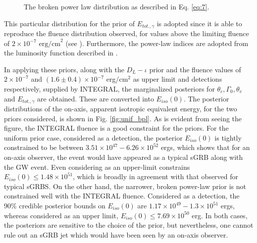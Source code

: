     \begin{figure}[H]
        \centering
        \def\svgwidth{0.5\textwidth}
        
        \caption[Broken power law distribution from \cite{ghirlanda_2016}.]
        {
            The broken power law distribution as described in Eq. \ref{eq:7}.
        }
        \label{fig:bpl_demo}
    \end{figure}

    This particular distribution for the prior of $E_{tot., \gamma}$ is adopted since it
    is able to reproduce the fluence distribution observed, for values above the
    limiting fluence of $2 \times 10^{-7} \text{ erg/cm}^2$ (see \cite{mohan_2019}).
    Furthermore, the power-law indices are adopted from the luminosity function
    described in \cite{ghirlanda_2016}.

    In applying these priors, along with the $D_L-\iota$ prior and the fluence values of
    $2 \times 10^{-7}$ and $(1.6 \pm 0.4) \times 10^{-7}$ erg/cm$^2$ as upper limit and
    detections respectively, supplied by INTEGRAL, the marginalized posteriors for
    $\theta_c, \Gamma_0, \theta_v$ and $E_{tot., \gamma}$ are obtained. These are
    converted into $E_{iso}(0)$. The posterior distributions of the on-axis, apparent
    isotropic equivalent energy, for the two priors considered, is shown in Fig.
    \ref{fig:unif_bpl}. As is evident from seeing the figure, the INTEGRAL fluence is a
    good constraint for the priors. For the uniform prior case, considered as a
    detection, the posterior $E_{iso}(0)$ is tightly constrained to be between
    $3.51\times 10^{47} - 6.26 \times 10^{52}$ ergs, which shows that for an on-axis
    observer, the event would have appeared as a typical sGRB along with the GW event.
    Even considering as an upper-limit constrains $E_{iso}(0) \leq 1.48\times 10^{51}$,
    which is broadly in agreement with that observed for typical sGRBS.  On the other
    hand, the narrower, broken power-law prior is not constrained well with the INTEGRAL
    fluence. Considered as a detection, the 90\% credible posterior bounds on
    $E_{iso}(0)$ are $1.17\times10^{49}-1.3\times10^{51}$ ergs, whereas considered as an
    upper limit, $E_{iso}(0) \leq 7.69 \times 10^{50}$ erg. In both cases, the
    posteriors are sensitive to the choice of the prior, but nevertheless, one cannot
    rule out an sGRB jet which would have been seen by an on-axis observer.

